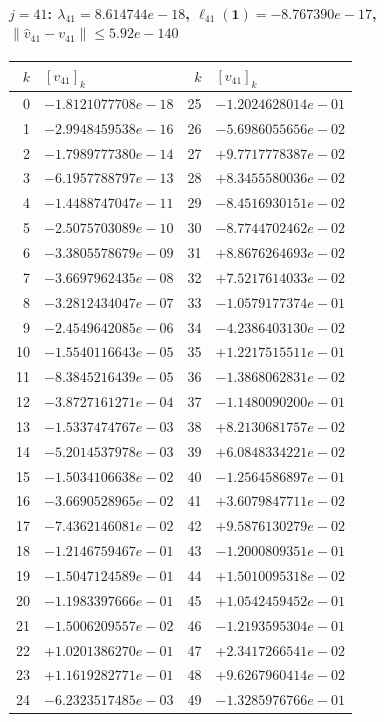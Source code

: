 \documentclass[11pt]{article}
\begin{document}
\paragraph{$j = 41$: $\lambda_{41} = 8.614744e-18$, \quad $\ell_{41}(\mathbf{1}) = -8.767390e-17$, \quad $\|\hat v_{41} - v_{41}\| \leq 5.92e-140$}
\begin{center}
{\footnotesize
\begin{tabular}{r@{\;\;}l@{\quad}r@{\;\;}l}
\toprule
$k$ & $[v_{41}]_k$ & $k$ & $[v_{41}]_k$ \\
\midrule
0 & $-1.8121077708e-18$ & 25 & $-1.2024628014e-01$ \\
1 & $-2.9948459538e-16$ & 26 & $-5.6986055656e-02$ \\
2 & $-1.7989777380e-14$ & 27 & $+9.7717778387e-02$ \\
3 & $-6.1957788797e-13$ & 28 & $+8.3455580036e-02$ \\
4 & $-1.4488747047e-11$ & 29 & $-8.4516930151e-02$ \\
5 & $-2.5075703089e-10$ & 30 & $-8.7744702462e-02$ \\
6 & $-3.3805578679e-09$ & 31 & $+8.8676264693e-02$ \\
7 & $-3.6697962435e-08$ & 32 & $+7.5217614033e-02$ \\
8 & $-3.2812434047e-07$ & 33 & $-1.0579177374e-01$ \\
9 & $-2.4549642085e-06$ & 34 & $-4.2386403130e-02$ \\
10 & $-1.5540116643e-05$ & 35 & $+1.2217515511e-01$ \\
11 & $-8.3845216439e-05$ & 36 & $-1.3868062831e-02$ \\
12 & $-3.8727161271e-04$ & 37 & $-1.1480090200e-01$ \\
13 & $-1.5337474767e-03$ & 38 & $+8.2130681757e-02$ \\
14 & $-5.2014537978e-03$ & 39 & $+6.0848334221e-02$ \\
15 & $-1.5034106638e-02$ & 40 & $-1.2564586897e-01$ \\
16 & $-3.6690528965e-02$ & 41 & $+3.6079847711e-02$ \\
17 & $-7.4362146081e-02$ & 42 & $+9.5876130279e-02$ \\
18 & $-1.2146759467e-01$ & 43 & $-1.2000809351e-01$ \\
19 & $-1.5047124589e-01$ & 44 & $+1.5010095318e-02$ \\
20 & $-1.1983397666e-01$ & 45 & $+1.0542459452e-01$ \\
21 & $-1.5006209557e-02$ & 46 & $-1.2193595304e-01$ \\
22 & $+1.0201386270e-01$ & 47 & $+2.3417266541e-02$ \\
23 & $+1.1619282771e-01$ & 48 & $+9.6267960414e-02$ \\
24 & $-6.2323517485e-03$ & 49 & $-1.3285976766e-01$ \\
\bottomrule
\end{tabular}
}
\end{center}
\end{document}
